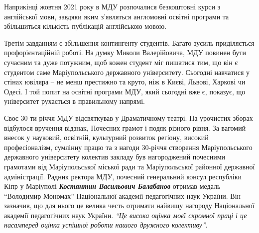 Наприкінці жовтня 2021 року в МДУ розпочалися безкоштовні курси з англійської
мови, завдяки яким з'являться англомовні освітні програми та збільшиться
кількість публікацій англійською мовою.


Третім завданням є збільшення контингенту студентів. Багато зусиль приділяється
профорієнтаційній роботі. На думку Миколи Валерійовича, МДУ повинен бути
сучасним та дуже потужним, щоб кожен студент міг пишатися тим, що він є
студентом саме Маріупольського державного університету. Сьогодні навчатися у
стінах ювіляра – не менш престижно та круто, ніж в Києві, Львові, Харкові чи
Одесі. І той попит на освітні програми МДУ, який сьогодні вже є, показує, що
університет рухається в правильному напрямі.


Своє 30-ти річчя МДУ відсвяткував у Драматичному театрі. На урочистих зборах
відбулося вручення відзнак, Почесних грамот і подяк різного рівня. За вагомий
внесок у науковий, освітній, культурний розвиток регіону, високий
професіоналізм, сумлінну працю та з нагоди 30-річчя створення Маріупольського
державного університету колектив закладу був нагороджений почесними грамотами
від Маріупольської міської ради та Маріупольської районної державної
адміністрації. Радник ректора МДУ, почесний генеральний консул республіки Кіпр
у Маріуполі \emph{\textbf{Костянтин Васильович Балабанов}} отримав медаль \enquote{Володимир Мономах}
Національної академії педагогічних наук України. Він  зазначив, що для нього це
велика честь отримати найвищу нагороду Національної академії педагогічних наук
України. \emph{\enquote{Це висока оцінка моєї скромної праці і це насамперед оцінка успішної
роботи нашого дружного колективу}}.


